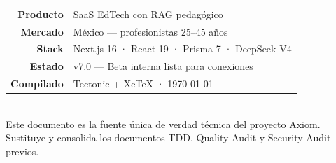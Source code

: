 \documentclass[10pt,a4paper,oneside]{report}
\begin{document}
\begin{titlepage}
\vspace{2cm}

\begin{center}
\end{center}

\vfill

\begin{center}
\renewcommand{\arraystretch}{1.4}
\begin{tabular}{@{}rl@{}}
\color{coral}\textbf{\textsf{Producto}} & \color{white}\textsf{SaaS EdTech con RAG pedagógico} \\
\color{coral}\textbf{\textsf{Mercado}} & \color{white}\textsf{México — profesionistas 25--45 años} \\
\color{coral}\textbf{\textsf{Stack}} & \color{white}\textsf{Next.js 16 · React 19 · Prisma 7 · DeepSeek V4} \\
\color{coral}\textbf{\textsf{Estado}} & \color{white}\textsf{v7.0 — Beta interna lista para conexiones} \\
\color{coral}\textbf{\textsf{Compilado}} & \color{white}\textsf{Tectonic + XeTeX · \today} \\
\end{tabular}
\end{center}

\vspace{1.2cm}

\begin{center}
\\[6pt]
{\color{white!60}\small\textsf{Este documento es la fuente única de verdad técnica del proyecto Axiom.}}\\[2pt]
{\color{white!40}\scriptsize\textsf{Sustituye y consolida los documentos TDD, Quality-Audit y Security-Audit previos.}}
\end{center}
\end{titlepage}
\end{document}
